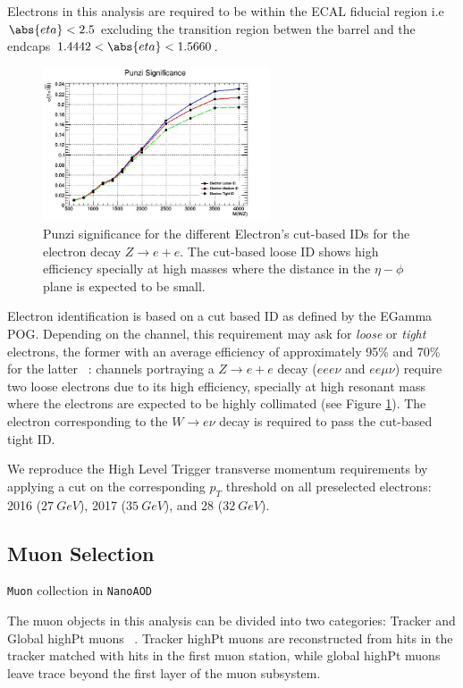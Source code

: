 Electrons in this analysis are required to be within the ECAL fiducial
region i.e $\abs{eta}<2.5$ excluding the transition region betwen the
barrel and the endcaps $1.4442<\abs{eta}<1.5660$.

\begin{figure}[tph]
  \centering
  \includegraphics[width=0.6\textwidth]{fig/LeptonIDStudies/ElectronIDPunzi.png}
  \caption{Punzi significance for the different Electron's cut-based IDs for the
    electron decay $Z\rightarrow e+e$. The cut-based loose ID shows high efficiency
    specially at high masses where the distance in the $\eta-\phi$ plane is
    expected to be small.}
  \label{fig:PunziElectronIDs}
\end{figure}

Electron identification is based on a cut based ID as defined by the
EGamma POG. Depending on the channel, this requirement
may ask for \emph{loose} or \emph{tight} electrons, the former with an
average efficiency of approximately 95\% and 70\% for
the latter ~\cite{EGammaPOG_el}: channels portraying a $Z\rightarrow e+e$
decay ($eee\nu$ and $ee\mu\nu$) require two loose
electrons due to its high efficiency, specially at high resonant mass where
the electrons are expected to be highly collimated (see Figure \ref{fig:PunziElectronIDs}).
The electron corresponding to the $W\rightarrow e\nu$ decay is required to pass
the cut-based tight ID.

We reproduce the High Level Trigger transverse momentum requirements by
applying a cut on the corresponding $p_T$ threshold on all
preselected electrons:
2016 ($27~GeV$), 2017 ($35~GeV$), and 28 ($32~GeV$).

\subsection{Muon Selection}

\verb|Muon| collection in \verb|NanoAOD|

The muon objects in this analysis can be divided into two categories:
Tracker and Global highPt muons ~\cite{MuonPOG}. Tracker highPt muons are
reconstructed from hits in the tracker matched with hits in the first
muon station, while global highPt muons leave trace beyond the first
layer of the muon subsystem.

